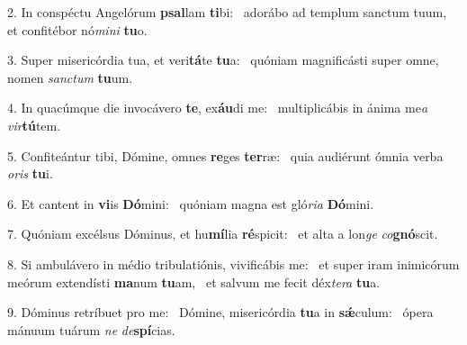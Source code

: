 2. In conspéctu Angelórum \textbf{psal}lam \textbf{ti}bi: \ast\  adorábo ad templum sanctum tuum, et confitébor nó\textit{mi}\textit{ni} \textbf{tu}o.\

3. Super misericórdia tua, et veri\textbf{tá}te \textbf{tu}a: \ast\  quóniam magnificásti super omne, nomen \textit{sanc}\textit{tum} \textbf{tu}um.\

4. In quacúmque die invocávero \textbf{te}, ex\textbf{áu}di me: \ast\  multiplicábis in ánima me\textit{a} \textit{vir}\textbf{tú}tem.\

5. Confiteántur tibi, Dómine, omnes \textbf{re}ges \textbf{ter}ræ: \ast\  quia audiérunt ómnia verba \textit{o}\textit{ris} \textbf{tu}i.\

6. Et cantent in \textbf{vi}is \textbf{Dó}mini: \ast\  quóniam magna est gló\textit{ri}\textit{a} \textbf{Dó}mini.\

7. Quóniam excélsus Dóminus, et hu\textbf{mí}lia \textbf{ré}spicit: \ast\  et alta a lon\textit{ge} \textit{co}\textbf{gnó}scit.\

8. Si ambulávero in médio tribulatiónis, vivificábis me: \dag\  et super iram inimicórum meórum extendísti \textbf{ma}num \textbf{tu}am, \ast\  et salvum me fecit déx\textit{te}\textit{ra} \textbf{tu}a.\

9. Dóminus retríbuet pro me: \dag\  Dómine, misericórdia \textbf{tu}a in \textbf{sǽ}culum: \ast\  ópera mánuum tuárum \textit{ne} \textit{de}\textbf{spí}cias.\

